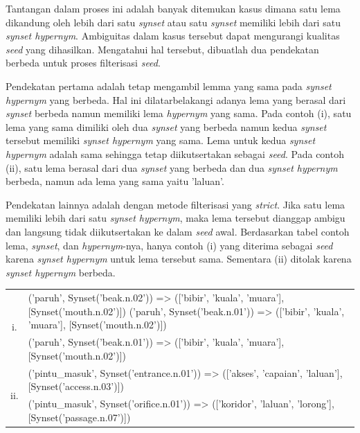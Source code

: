 Tantangan dalam proses ini adalah banyak ditemukan kasus dimana satu lema dikandung oleh lebih dari satu \textit{synset} atau satu \textit{synset} memiliki lebih dari satu \textit{synset hypernym}. Ambiguitas dalam kasus tersebut dapat mengurangi kualitas \textit{seed} yang dihasilkan. Mengatahui hal tersebut, dibuatlah dua pendekatan berbeda untuk proses filterisasi \textit{seed}.

Pendekatan pertama adalah tetap mengambil lemma yang sama pada \textit{synset hypernym} yang berbeda. Hal ini dilatarbelakangi adanya lema yang berasal dari \textit{synset} berbeda namun memiliki lema \textit{hypernym} yang sama. Pada contoh (i), satu lema yang sama dimiliki oleh dua \textit{synset} yang berbeda namun kedua \textit{synset} tersebut memiliki \textit{synset hypernym} yang sama. Lema untuk kedua \textit{synset hypernym} adalah sama sehingga tetap diikutsertakan sebagai \textit{seed}. Pada contoh (ii), satu lema berasal dari dua \textit{synset} yang berbeda dan dua \textit{synset hypernym} berbeda, namun ada lema yang sama yaitu 'laluan'.

Pendekatan lainnya adalah dengan metode filterisasi yang \textit{strict}. Jika satu lema memiliki lebih dari satu \textit{synset hypernym}, maka lema tersebut dianggap ambigu dan langsung tidak diikutsertakan ke dalam \textit{seed} awal. Berdasarkan tabel contoh lema, \textit{synset}, dan \textit{hypernym}-nya, hanya contoh (i) yang diterima sebagai \textit{seed} karena \textit{synset hypernym} untuk lema tersebut sama. Sementara (ii) ditolak karena \textit{synset hypernym} berbeda.

\begin{center}
\begin{tabular}{ |c|m{30em}| } 
\hline
\multirow{2}{*}{i.} & ('paruh', Synset('beak.n.02')) => (['bibir', 'kuala', 'muara'], [Synset('mouth.n.02')])
('paruh', Synset('beak.n.01')) => (['bibir', 'kuala', 'muara'], [Synset('mouth.n.02')]) \\ 
& ('paruh', Synset('beak.n.01')) => (['bibir', 'kuala', 'muara'], [Synset('mouth.n.02')]) \\ 
\hline
\multirow{2}{*}{ii.} & ('pintu\_masuk', Synset('entrance.n.01')) => (['akses', 'capaian', 'laluan'], [Synset('access.n.03')]) \\ 
& ('pintu\_masuk', Synset('orifice.n.01')) => (['koridor', 'laluan', 'lorong'], [Synset('passage.n.07')]) \\ 
\hline
\end{tabular}
\end{center}


